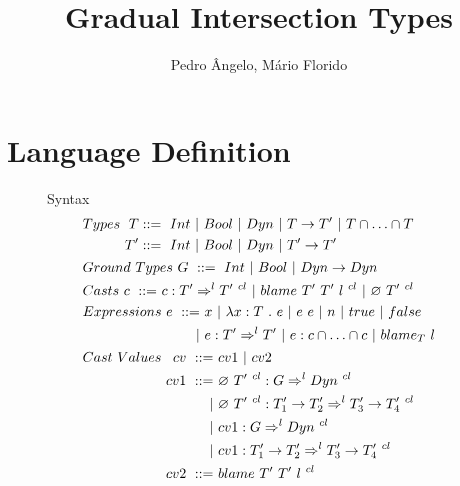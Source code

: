 \documentclass[a4paper]{article}
\begin{document}
\title{Gradual Intersection Types}

\author{Pedro Ângelo, Mário Florido}

\maketitle
{}

\section{Language Definition}
\begin{figure}[H]
Syntax
\begin{align*}
&Types\ \begin{aligned}[t] T &::=\ \Int\ |\ \Bool\ |\ \Dyn\ |\ T \rightarrow T'\ |\ T \cap \ldots \cap T\\
                          T' &::=\ \Int\ |\ \Bool\ |\ \Dyn\ |\ T' \rightarrow T' \end{aligned}\\
&Ground\ Types\ G\ ::=\ \Int\ |\ \Bool\ |\ \Dyn \rightarrow \Dyn\\
&Casts\ \begin{aligned}[t] c\ ::=&\ c : T' \Rightarrow^l T'\ ^{cl}\ |\ \blamecast{T'}{T'}{l}{cl}\ |\ \emptycast{T'}{cl}\ \iffalse |\ \stuckcast{T'}{T'}{n}\fi \end{aligned}\\
&Expressions\ \begin{aligned}[t] e\ ::=&\ x\ |\ \lambda x : T\ .\ e\ |\ e\ e\ |\ n\ |\ \true\ |\ \false\\
                                      |&\ e : T' \Rightarrow^l T'\ |\ e : c \cap \ldots \cap c\ |\ \blame{T}{l} \end{aligned}\\
&Cast\ Values\ \begin{aligned}[t] cv\ ::=&\ cv1\ |\ cv2\\
                                cv1\ ::=&\ \emptycast{T'}{cl} : G \Rightarrow^l \Dyn\ ^{cl}\\
                                       |&\ \emptycast{T'}{cl} : T'_1 \rightarrow T'_2 \Rightarrow^l T'_3 \rightarrow T'_4\ ^{cl}\\
                                       |&\ cv1 : G \Rightarrow^l \Dyn\ ^{cl}\\
                                       |&\ cv1 : T'_1 \rightarrow T'_2 \Rightarrow^l T'_3 \rightarrow T'_4\ ^{cl}\\
                                cv2\ ::=&\ \blamecast{T'}{T'}{l}{cl}\\

\end{aligned}
\end{align*}
\end{figure}
\end{document}
